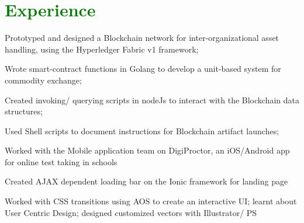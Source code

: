 \documentclass[letterpaper]{deedy-resume-openfont} %
\begin{document}
\begin{minipage}[t]{0.66\textwidth} %


\section{\textcolor{GREEN}{Experience}}

\vspace{\topsep} %
\begin{tightemize}
\item Prototyped and designed a Blockchain network for inter-organizational asset handling, using the Hyperledger Fabric v1 framework;
\item Wrote smart-contract functions in Golang to develop a unit-based system for commodity exchange;
\item Created invoking/ querying scripts in nodeJs to interact with the Blockchain data structures;
\item Used Shell scripts to document instructions for Blockchain artifact launches;
\end{tightemize}

\sectionsep %

\begin{tightemize}
\item Worked with the Mobile application team on DigiProctor, an iOS/Android app for online test taking in schools
\item Created AJAX dependent loading bar on the Ionic framework for landing page
\item Worked with CSS transitions using AOS to create an interactive UI; learnt about User Centric Design; designed customized vectors with Illustrator/ PS 
\end{tightemize}

\sectionsep %



\end{minipage}
\end{document}
